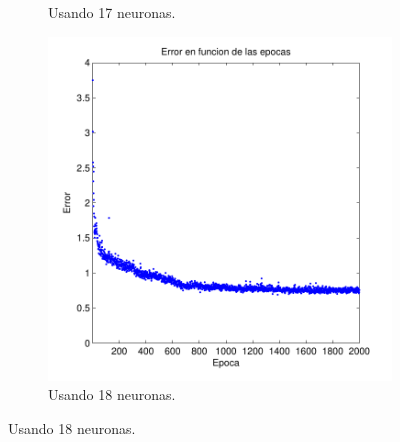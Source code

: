 \documentclass[informe.tex]{subfiles}
\begin{document}
\begin{figure}[H]
\begin{subfigure}[b]{0.32\textwidth}
                \caption{Usando 17 neuronas.}
                \label{fig:d2-f2-2k-01-n17}
        \end{subfigure}
        \begin{subfigure}[b]{0.32\textwidth}
                \includegraphics[width=\textwidth]{graficos/error_fold2_18_binary-regresion_2000_01.pdf}
                \caption{Usando 18 neuronas.}
                \label{fig:d2-f2-2k-01-n18}
        \end{subfigure}
        

\end{figure}
\end{document}
